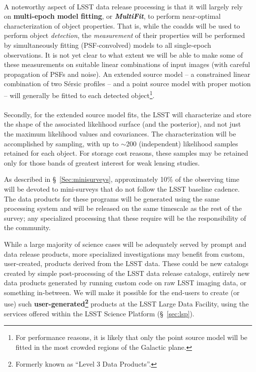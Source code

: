 \begin{itemize}
\\
A noteworthy aspect of LSST data release processing is that it will largely
rely on \textbf{multi-epoch model fitting}, or \textbf{\emph{MultiFit}}, to
perform near-optimal characterization of object properties. That is,
while the coadds will be used to perform object \emph{detection}, the
\emph{measurement} of their properties will be performed by
simultaneously fitting (PSF-convolved) models to all single-epoch
observations. It is not yet clear to what extent we will be able to make some of these
measurements on suitable linear combinations of input images (with careful propagation
of PSFs and noise).
An extended source model -- a constrained linear
combination of two S\'ersic profiles -- and a point source model with
proper motion -- will generally be
fitted to each detected object\footnote{For performance reasons, it is
  likely that only the point source model will be fitted in the most
  crowded regions of the Galactic plane.}.\\
\\
Secondly, for the extended source model fits, the LSST will
characterize and store the shape of the associated likelihood surface
(and the posterior), and not just the maximum likelihood values and
covariances. The characterization will be accomplished by sampling,
with up to $\sim$200 (independent) likelihood samples retained for
each object. For storage cost reasons, these samples
may be retained only for those bands of greatest interest for
weak lensing studies.

\end{itemize}

As described in \S~\ref{Sec:minisurveys}, approximately 10\% of the
observing time will be devoted to mini-surveys that do not follow the
LSST baseline cadence. The data products for these programs will be
generated using the same processing system and will be released on the
same timescale as the rest of the survey; any specialized processing
that these require will be the responsibility of the community.

While a large majority of science cases will be adequately served by prompt
and data release products, more specialized investigations may benefit from
custom, user-created, products derived from the LSST data.  These could be
new catalogs created by simple post-processing of the LSST data release
catalogs, entirely new data products generated by running custom code on raw
LSST imaging data, or something in-between.  We will make it possible for the
end-users to create (or use) such \textbf{user-generated\footnote{Formerly known as
``Level 3 Data Products''.}} products at the LSST Large Data Facility,
using the services offered within the LSST Science Platform (\S~\ref{sec:lsp}).


